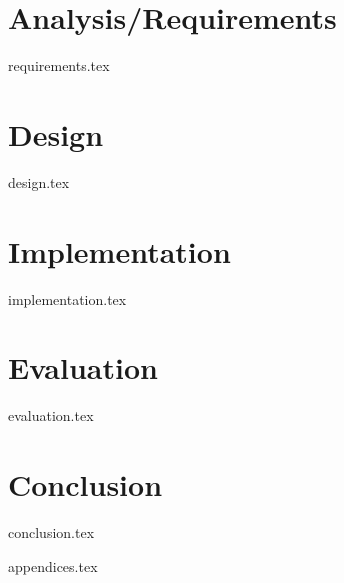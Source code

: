 \documentclass{l4proj}
\begin{document}
\chapter{Analysis/Requirements}\label{anReq}
{requirements.tex}
\chapter{Design}\label{des}
{design.tex}

\chapter{Implementation}\label{imp}
{implementation.tex}

\chapter{Evaluation} \label{eval}
{evaluation.tex}

\chapter{Conclusion}\label{conc}
{conclusion.tex}

%
% 
\begin{appendices}
{appendices.tex}
\end{appendices}






% 
% 
\end{document}
